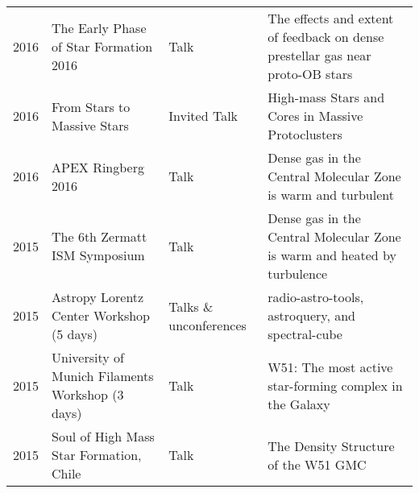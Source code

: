 \begin{tabular}{cp{1.8in}p{1.5cm}p{3.0in}}
    2016 &      The Early Phase of Star Formation 2016 & Talk & The effects and extent of feedback on dense prestellar gas near proto-OB stars \\
    2016 &      From Stars to Massive Stars & Invited Talk & High-mass Stars and Cores in Massive Protoclusters \\
    2016 &      APEX Ringberg 2016 & Talk & Dense gas in the Central Molecular Zone is warm and turbulent \\
    2015 &      The 6th Zermatt ISM Symposium & Talk & Dense gas in the Central Molecular Zone is warm and heated by turbulence \\
    2015 &      Astropy Lorentz Center Workshop (5 days) & Talks \& unconferences & radio-astro-tools, astroquery, and spectral-cube \\ 
    2015 &      University of Munich Filaments Workshop (3 days) & Talk & W51: The most active star-forming complex in the Galaxy \\
    2015 &      Soul of High Mass Star Formation, Chile & Talk & The Density Structure of the W51 GMC \\

\end{tabular}
